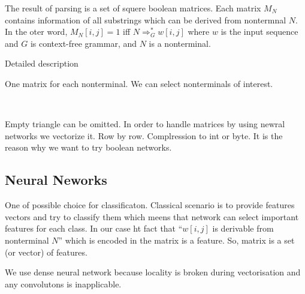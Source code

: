 \documentclass[a4paper,twoside]{article}
\begin{document}
\noindent The result of parsing is a set of squere boolean matrices. 
Each matrix $M_N$ contains information of all substrings which can be derived from nontermnal $N$.
In the oter word, $M_N[i,j]=1$ iff $N \Rightarrow^*_G w[i,j]$ where $w$ is the input sequence and $G$ is context-free grammar, and $N$ is a nonterminal.

Detailed description

One matrix for each nonterminal.
We can select nonterminals of interest.


{\centering
  \
  \
  }

Empty triangle can be omitted.
In order to handle matrices by using newral networks we vectorize it.
Row by row.
Complression to int or byte.
It is the reason why we want to try boolean networks.

\subsection{Neural Neworks}

One of possible choice for classificaton.
Classical scenario is to provide features vectors and try to classify them which meens that network can select important features for each class.
In our case ht fact that ``$w[i,j]$ is derivable from nonterminal $N$'' which is encoded in the matrix is a feature.
So, matrix is a set (or vector) of features.

We use dense neural network because locality is broken during vectorisation and any convolutons is inapplicable.
\end{document}

